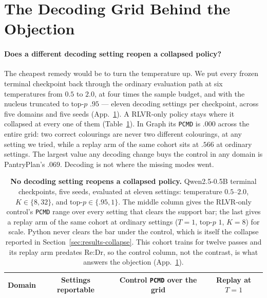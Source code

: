 \documentclass{article}
\newcommand{\1}{\mathbf 1}
\newcommand{\pmd}{\texttt{PCMD}}
\theoremstyle{remark}
\theoremstyle{definition}
\theoremstyle{plain}
\begin{document}
\clearpage
\section{The Decoding Grid Behind the Objection}
\label{app:decoding-objection}

\paragraph{Does a different decoding setting reopen a collapsed policy?}
The cheapest remedy would be to turn the temperature up. We put every frozen
terminal checkpoint back through the ordinary evaluation path at six
temperatures from $0.5$ to $2.0$, at four times the sample budget, and with the
nucleus truncated to top-$p$ $.95$ --- eleven decoding settings per checkpoint,
across five domains and five seeds (App.~\ref{app:decoding-objection}). A
RLVR-only policy stays where it collapsed at every one of them
(Table~\ref{tab:decoding-objection}). In Graph its \pmd{} is $.000$ across the
entire grid: two correct colourings are never two different colourings, at any
setting we tried, while a replay arm of the same cohort sits at $.566$ at
ordinary settings. The largest value any decoding change buys the control in
any domain is PantryPlan's $.069$. Decoding is not where the missing modes went.

\begin{table}[!htbp]
  \centering
  \caption{\textbf{No decoding setting reopens a collapsed policy.}
  Qwen2.5-0.5B terminal checkpoints, five seeds, evaluated at eleven settings:
  temperature $0.5$--$2.0$, $K\in\{8,32\}$, and top-$p\in\{.95,1\}$. The middle
  column gives the RLVR-only control's \pmd{} range over every setting that
  clears the support bar; the last gives a replay arm of the same cohort at
  ordinary settings ($T=1$, top-$p$ $1$, $K=8$) for scale. Python never clears
  the bar under the control, which is itself the collapse reported in
  Section~\ref{sec:results-collapse}. This cohort trains for twelve passes and
  its replay arm predates Re:Dr, so the control column, not the contrast,
  is what answers the objection (App.~\ref{app:decoding-objection}).}
  \label{tab:decoding-objection}
  \small
  \begin{tabular}{@{}lccc@{}}
    \toprule
    \textbf{Domain} & \textbf{Settings reportable} &
      \textbf{Control \pmd{} over the grid} & \textbf{Replay at $T=1$} \\
    \midrule
    
  \end{tabular}
\end{table}
\end{document}
